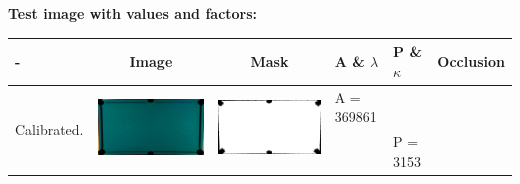 \textbf{Test image with values and factors:}\\
\begin{tabular}{|l|c|c|l|l|c|}
\hline - & Image & Mask & A \& $\lambda$ & P \& $\kappa$ & Occlusion \\ 
\hline

\multirow{2}{*}{Calibrated.} & \multirow{2}{*}{\includegraphics[scale=0.05]{../images/1/calibimg.png}} & \multirow{2}{*}{\includegraphics[scale=0.05]{../images/1/calibmask.png}} & A = 369861 &  & \multirow{2}{*}{}\\  
& & & & P = 3153 & \\
\hline


\end{tabular}
